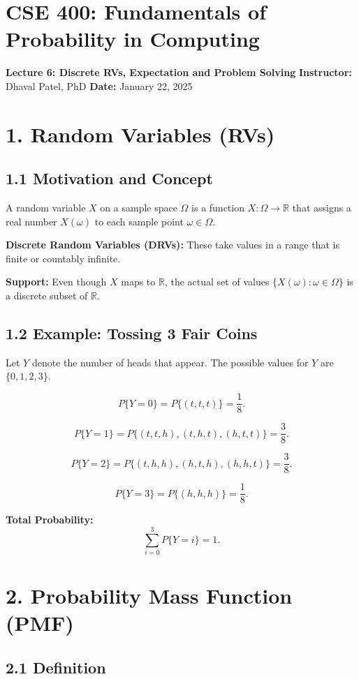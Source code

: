 \documentclass{article}
\begin{document}
\section*{CSE 400: Fundamentals of Probability in Computing}

\textbf{Lecture 6: Discrete RVs, Expectation and Problem Solving}  
\textbf{Instructor:} Dhaval Patel, PhD  
\textbf{Date:} January 22, 2025  

\section*{1. Random Variables (RVs)}

\subsection*{1.1 Motivation and Concept}

A random variable $X$ on a sample space $\Omega$ is a function $X:\Omega\rightarrow\mathbb{R}$ that assigns a real number $X(\omega)$ to each sample point $\omega\in\Omega$.

\textbf{Discrete Random Variables (DRVs):} These take values in a range that is finite or countably infinite.

\textbf{Support:} Even though $X$ maps to $\mathbb{R}$, the actual set of values $\{X(\omega):\omega\in\Omega\}$ is a discrete subset of $\mathbb{R}$.

\subsection*{1.2 Example: Tossing 3 Fair Coins}

Let $Y$ denote the number of heads that appear. The possible values for $Y$ are $\{0, 1, 2, 3\}$.

\[
P\{Y=0\} = P\{(t,t,t)\} = \frac{1}{8}.
\]

\[
P\{Y=1\} = P\{(t,t,h),(t,h,t),(h,t,t)\} = \frac{3}{8}.
\]

\[
P\{Y=2\} = P\{(t,h,h),(h,t,h),(h,h,t)\} = \frac{3}{8}.
\]

\[
P\{Y=3\} = P\{(h,h,h)\} = \frac{1}{8}.
\]

\textbf{Total Probability:}
\[
\sum_{i=0}^{3}P\{Y=i\} = 1.
\]

\section*{2. Probability Mass Function (PMF)}

\subsection*{2.1 Definition}
\end{document}
